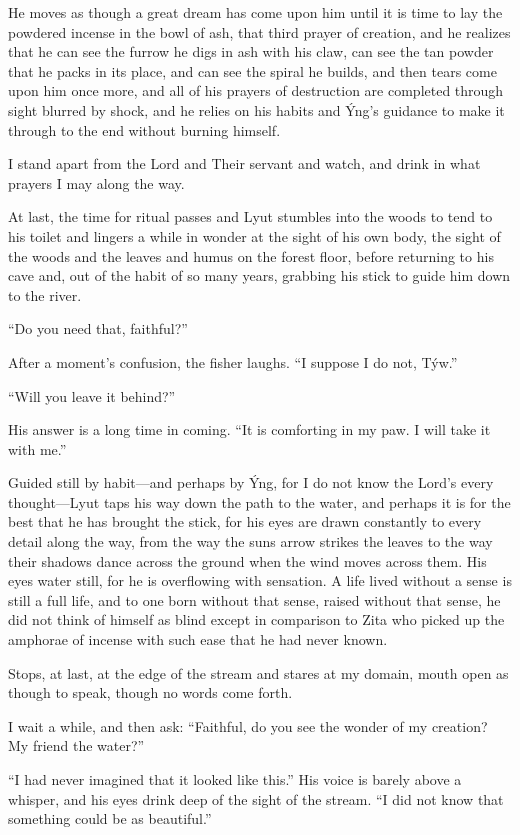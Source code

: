 He moves as though a great dream has come upon him until it is time to lay the powdered incense in the bowl of ash, that third prayer of creation, and he realizes that he can see the furrow he digs in ash with his claw, can see the tan powder that he packs in its place, and can see the spiral he builds, and then tears come upon him once more, and all of his prayers of destruction are completed through sight blurred by shock, and he relies on his habits and Ýng's guidance to make it through to the end without burning himself.

I stand apart from the Lord and Their servant and watch, and drink in what prayers I may along the way.

At last, the time for ritual passes and Lyut stumbles into the woods to tend to his toilet and lingers a while in wonder at the sight of his own body, the sight of the woods and the leaves and humus on the forest floor, before returning to his cave and, out of the habit of so many years, grabbing his stick to guide him down to the river.

``Do you need that, faithful?''

After a moment's confusion, the fisher laughs. ``I suppose I do not, Týw.''

``Will you leave it behind?''

His answer is a long time in coming. ``It is comforting in my paw. I will take it with me.''

Guided still by habit---and perhaps by Ýng, for I do not know the Lord's every thought---Lyut taps his way down the path to the water, and perhaps it is for the best that he has brought the stick, for his eyes are drawn constantly to every detail along the way, from the way the suns arrow strikes the leaves to the way their shadows dance across the ground when the wind moves across them. His eyes water still, for he is overflowing with sensation. A life lived without a sense is still a full life, and to one born without that sense, raised without that sense, he did not think of himself as blind except in comparison to Zita who picked up the amphorae of incense with such ease that he had never known.

Stops, at last, at the edge of the stream and stares at my domain, mouth open as though to speak, though no words come forth.

I wait a while, and then ask: ``Faithful, do you see the wonder of my creation? My friend the water?''

``I had never imagined that it looked like this.'' His voice is barely above a whisper, and his eyes drink deep of the sight of the stream. ``I did not know that something could be as beautiful.''

